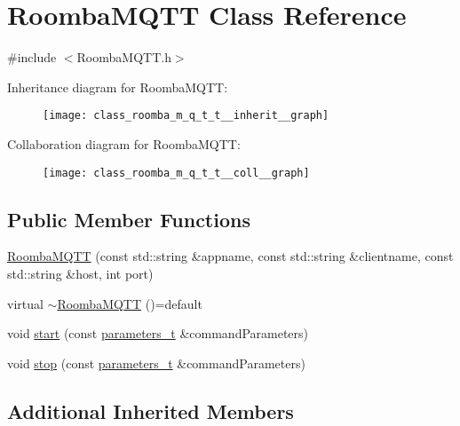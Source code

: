 \hypertarget{class_roomba_m_q_t_t}{}\section{Roomba\+M\+Q\+TT Class Reference}
\label{class_roomba_m_q_t_t}


{\ttfamily \#include $<$Roomba\+M\+Q\+T\+T.\+h$>$}



Inheritance diagram for Roomba\+M\+Q\+TT\+:\nopagebreak
\begin{figure}[H]
\begin{center}
\leavevmode
\texttt{[image: class\_roomba\_m\_q\_t\_t\_\_inherit\_\_graph]}
\end{center}
\end{figure}


Collaboration diagram for Roomba\+M\+Q\+TT\+:\nopagebreak
\begin{figure}[H]
\begin{center}
\leavevmode
\texttt{[image: class\_roomba\_m\_q\_t\_t\_\_coll\_\_graph]}
\end{center}
\end{figure}
\subsection*{Public Member Functions}
\begin{DoxyCompactItemize}
\item 
\hyperlink{class_roomba_m_q_t_t_a20d5a60deabb9b8148a3cf0f1409dc71}{Roomba\+M\+Q\+TT} (const std\+::string \&appname, const std\+::string \&clientname, const std\+::string \&host, int port)
\item 
virtual \hyperlink{class_roomba_m_q_t_t_a09e4ed694fcbf4e1f158d0f4eb49683d}{$\sim$\+Roomba\+M\+Q\+TT} ()=default
\item 
void \hyperlink{class_roomba_m_q_t_t_a5ff4dbb094de2963bf4967fd5bf55b83}{start} (const \hyperlink{_heater_m_q_t_t_8h_ad3b3bd6544a775cf1e31cd71610c5765}{parameters\+\_\+t} \&command\+Parameters)
\item 
void \hyperlink{class_roomba_m_q_t_t_ac0a3f9c36b0865eb3e61e68ad0ef2115}{stop} (const \hyperlink{_heater_m_q_t_t_8h_ad3b3bd6544a775cf1e31cd71610c5765}{parameters\+\_\+t} \&command\+Parameters)
\end{DoxyCompactItemize}
\subsection*{Additional Inherited Members}


